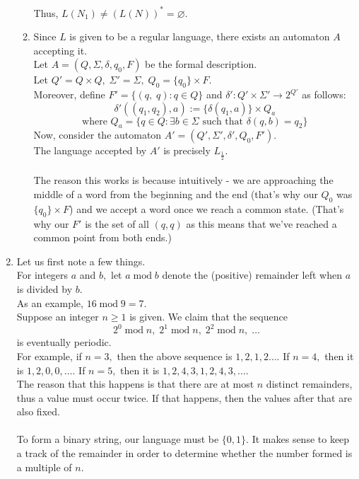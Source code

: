 \documentclass{article}
\let\emptyset\varnothing
\begin{document}
\begin{enumerate}[label = \arabic*.]
\begin{enumerate}[label = (\alph*)]
		Thus, $L(N_1) \neq (L\left(N\right))^* = \emptyset.$
		\item Since $L$ is given to be a regular language, there exists an automaton $A$ accepting it.\\
		Let $A = (Q, \Sigma, \delta, q_0, F)$ be the formal description.\\
		Let $Q' = Q \times Q,\; \Sigma' = \Sigma,\;Q_0 = \{q_0\}\times F.$\\
		Moreover, define $F' = \{(q,\;q) : q \in Q\}$ and $\delta':Q'\times\Sigma'\to2^{Q'}$ as follows:
		\[\delta'\left((q_1, q_2), a\right) := \{\delta(q_1, a)\}\times Q_a\]
		\[\text{where } Q_a = \{q \in Q : \exists b \in \Sigma \text{ such that } \delta(q, b) = q_2\}\]
		Now, consider the automaton $A' = (Q', \Sigma', \delta', Q_0, F').$\\
		The language accepted by $A'$ is precisely $L_{\frac{1}{2}}.$\\~\\
		The reason this works is because intuitively - we are approaching the middle of a word from the beginning and the end (that's why our $Q_0$ was $\{q_0\}\times F$) and we accept a word once we reach a common state. (That's why our $F'$ is the set of all $(q, q)$ as this means that we've reached a common point from both ends.)
	\end{enumerate}
	\item Let us first note a few things. \\
	For integers $a$ and $b,$ let $a  \operatorname{mod} b$ denote the (positive) remainder left when $a$ is divided by $b.$\\
	As an example, $16  \operatorname{mod} 9 = 7.$\\
	Suppose an integer $n \ge 1$ is given. We claim that the sequence
	\[2^0  \operatorname{mod} n,\;2^1  \operatorname{mod} n,\;2^2  \operatorname{mod} n,\;\ldots\]
	is eventually periodic.\\
	For example, if $n = 3,$ then the above sequence is $1,2,1,2\ldots.$ If $n = 4,$ then it is $1, 2, 0, 0,\ldots.$ If $n = 5,$ then it is $1, 2, 4, 3, 1, 2, 4, 3,\ldots.$\\
	The reason that this happens is that there are at most $n$ distinct remainders, thus a value must occur twice. If that happens, then the values after that are also fixed.\\~\\
	To form a binary string, our language must be $\{0,1\}.$ It makes sense to keep a track of the remainder in order to determine whether the number formed is a multiple of $n.$\\

\end{enumerate}
\end{document}
